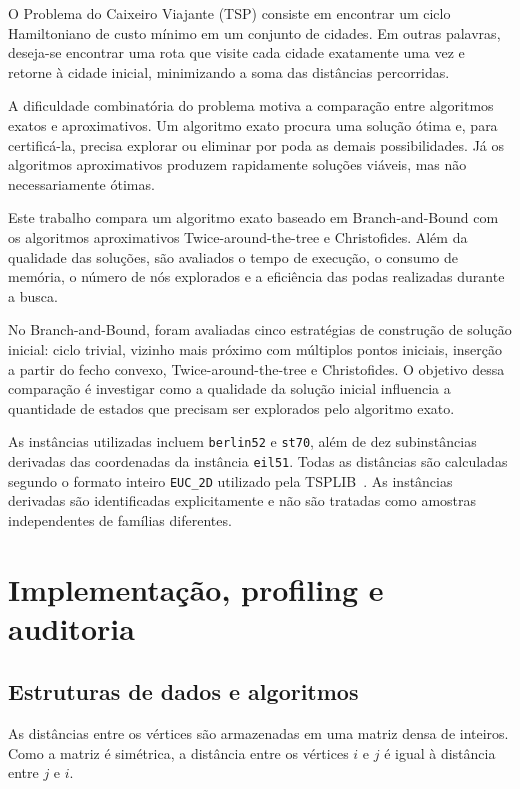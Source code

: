 \documentclass[12pt]{article}
\begin{document}
O Problema do Caixeiro Viajante (TSP) consiste em encontrar um ciclo Hamiltoniano de custo mínimo em um conjunto de cidades. Em outras palavras, deseja-se encontrar uma rota que visite cada cidade exatamente uma vez e retorne à cidade inicial, minimizando a soma das distâncias percorridas.

A dificuldade combinatória do problema motiva a comparação entre algoritmos exatos e aproximativos. Um algoritmo exato procura uma solução ótima e, para certificá-la, precisa explorar ou eliminar por poda as demais possibilidades. Já os algoritmos aproximativos produzem rapidamente soluções viáveis, mas não necessariamente ótimas.

Este trabalho compara um algoritmo exato baseado em Branch-and-Bound com os algoritmos aproximativos Twice-around-the-tree e Christofides. Além da qualidade das soluções, são avaliados o tempo de execução, o consumo de memória, o número de nós explorados e a eficiência das podas realizadas durante a busca.

No Branch-and-Bound, foram avaliadas cinco estratégias de construção de solução inicial: ciclo trivial, vizinho mais próximo com múltiplos pontos iniciais, inserção a partir do fecho convexo, Twice-around-the-tree e Christofides. O objetivo dessa comparação é investigar como a qualidade da solução inicial influencia a quantidade de estados que precisam ser explorados pelo algoritmo exato.

As instâncias utilizadas incluem \texttt{berlin52} e \texttt{st70}, além de dez subinstâncias derivadas das coordenadas da instância \texttt{eil51}. Todas as distâncias são calculadas segundo o formato inteiro \texttt{EUC\_2D} utilizado pela TSPLIB~\cite{tsplib}. As instâncias derivadas são identificadas explicitamente e não são tratadas como amostras independentes de famílias diferentes.

\section{Implementação, profiling e auditoria}

\subsection{Estruturas de dados e algoritmos}

As distâncias entre os vértices são armazenadas em uma matriz densa de inteiros. Como a matriz é simétrica, a distância entre os vértices $i$ e $j$ é igual à distância entre $j$ e $i$.
\end{document}
